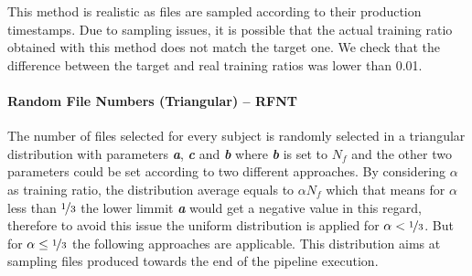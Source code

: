 \documentclass[10pt, conference, compsocconf]{IEEEtran}
\begin{document}
This method is realistic as files are sampled according to their production timestamps.
Due to sampling issues, it is possible that the actual training ratio obtained with this method
does not match the target one. We check that the difference between the target and real training ratios
was lower than 0.01.\\ 

\paragraph{Random File Numbers (Triangular) -- RFNT}
The number of files selected for every subject is randomly selected in
a triangular distribution with parameters \textit{\textbf{a}}, \textit{\textbf{c}} 
and \textit{\textbf{b}} where \textit{\textbf{b}} is set to $N_{f}$ and the other 
two parameters could be set according to two different approaches. By considering $\alpha$ 
as training ratio, the distribution average equals to $\alpha N_{f}$ which that means 
for $\alpha$ less than $\nicefrac{1}{3}$ the lower limmit \textit{\textbf{a}} would 
get a negative value in this regard, therefore to avoid this issue the uniform distribution 
is applied for $\alpha < \nicefrac{1}{3}$. But for $\alpha \leq \nicefrac{1}{3}$ the following 
approaches are applicable. This distribution aims at sampling files produced towards 
the end of the pipeline execution.
\end{document}
